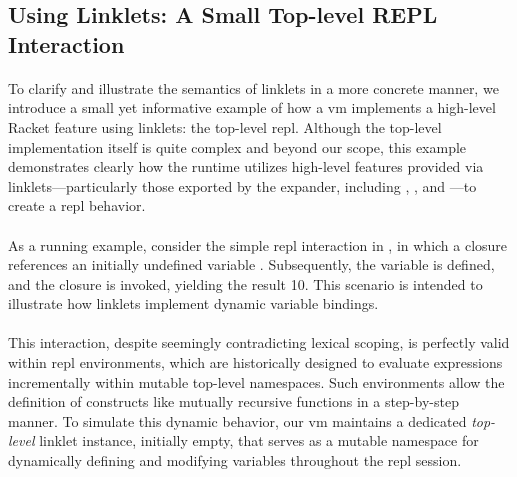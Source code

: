 		\subsection{Using Linklets: A Small Top-level REPL Interaction}
		\label{subsec:toplevel-example}

		\paragraph{}%
			To clarify and illustrate the semantics of linklets in a more concrete manner, we introduce a small yet informative example of how a \gls{vm} implements a high-level Racket feature using linklets: the top-level \gls{repl}. Although the top-level implementation itself is quite complex and beyond our scope, this example demonstrates clearly how the runtime utilizes high-level features provided via linklets—particularly those exported by the expander, including , , and —to create a \gls{repl} behavior.

		\paragraph{}%
			As a running example, consider the simple \gls{repl} interaction in , in which a closure  references an initially undefined variable . Subsequently, the variable  is defined, and the closure is invoked, yielding the result 10. This scenario is intended to illustrate how linklets implement dynamic variable bindings.


		\paragraph{}%
			This interaction, despite seemingly contradicting lexical scoping, is perfectly valid within \gls{repl} environments, which are historically designed to evaluate expressions incrementally within mutable top-level namespaces. Such environments allow the definition of constructs like mutually recursive functions in a step-by-step manner. To simulate this dynamic behavior, our \gls{vm} maintains a dedicated \emph{top-level} linklet instance, initially empty, that serves as a mutable namespace for dynamically defining and modifying variables throughout the \gls{repl} session.

